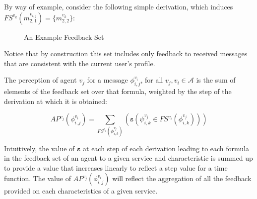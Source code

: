 \documentclass[]{llncs}
\begin{document}
By way of example, consider the following simple derivation, which induces $FS^{v_{k}}(m^{v_{i,j}}_{2,1})=\{m^{v_{k}}_{2,2}\}$: 

\begin{figure*}
\begin{tiny}

	\begin{prooftree}
		
		\end{prooftree}
\end{tiny}


	\caption{An Example Feedback Set}\label{fig:ask}

\end{figure*}

Notice that by construction this set includes only feedback to received messages that are consistent with the current user's profile. 

\begin{definition}
The perception of agent $v_{j}$ for a message $\phi^{v_{i}}_{i,j}$, for all $v_{j}, v_{i} \in \mathcal{A}$ is the sum of elements of the feedback set over that formula, weighted by the step of the derivation at which it is obtained: 

\[
AP^{v_{j}}(\phi^{v_{i}}_{i,j})=\sum_{FS^{v_{i}}(\phi^{v_{j}}_{i,k})}(\mathtt{s}(\psi^{v_{j}}_{i,k} \in FS^{v_{i}}(\phi^{v_{j}}_{i,k})))
\]

\end{definition}

Intuitively, the value of $\mathtt{s}$ at each step of each derivation leading to each formula in the feedback set of an agent to a given service and characteristic is summed up to provide a value that increases linearly to reflect a step value for a time function. The value of $AP^{v_{j}}(\phi^{v_{i}}_{i,j})$ will reflect the aggregation of all the feedback provided on each characteristics of a given service.  
\end{document}
